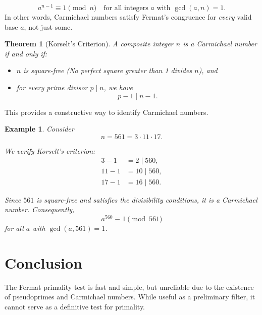 \documentclass{article}
\newtheorem{theorem}{Theorem}
\newtheorem{example}{Example}
\begin{document}
\[
a^{n-1} \equiv 1 \pmod{n}
\quad \text{for all integers } a \text{ with } \gcd(a,n)=1.
\]
In other words, Carmichael numbers satisfy Fermat's congruence for \emph{every} valid base $a$, not just some.
\begin{theorem}[Korselt's Criterion]
A composite integer $n$ is a Carmichael number if and only if:
\begin{itemize}
    \item $n$ is square-free (No perfect square greater than 1 divides $n$), and
    \item for every prime divisor $p \mid n$, we have
    \[
    p - 1 \mid n - 1.
    \]
\end{itemize}
\end{theorem}

This provides a constructive way to identify Carmichael numbers.

\begin{example}
  Consider
  \[
  n = 561 = 3 \cdot 11 \cdot 17.
  \]

  We verify Korselt's criterion:
  \[
  \begin{aligned}
  3 - 1 &= 2 \mid 560, \\
  11 - 1 &= 10 \mid 560, \\
  17 - 1 &= 16 \mid 560.
  \end{aligned}
  \]

  Since $561$ is square-free and satisfies the divisibility conditions, it is a
  Carmichael number. Consequently,
  \[
  a^{560} \equiv 1 \pmod{561}
  \]
  for all $a$ with $\gcd(a,561)=1$.
\end{example}

\section*{Conclusion}

The Fermat primality test is fast and simple, but unreliable due to the existence of pseudoprimes and Carmichael numbers. While useful as a preliminary filter, it cannot serve as a definitive test for primality.
\end{document}
